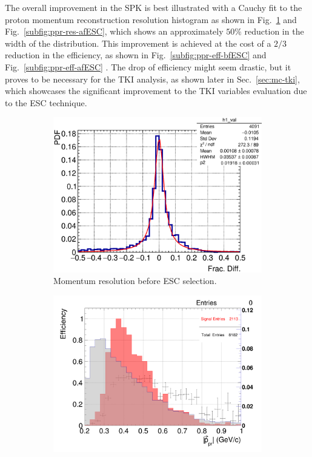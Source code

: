    The overall improvement in the SPK is best illustrated with a Cauchy fit to the proton momentum reconstruction resolution histogram as shown in Fig.~\ref{subfig:ppr-res-bfESC} and Fig.~\ref{subfig:ppr-res-afESC}, which shows an approximately $50\%$ reduction in the width of the distribution.
   This improvement is achieved at the cost of a $2/3$ reduction in the efficiency, as shown in Fig.~\ref{subfig:ppr-eff-bfESC} and Fig.~\ref{subfig:ppr-eff-afESC} .
   The drop of efficiency might seem drastic, but it proves to be necessary for the TKI analysis, as shown later in Sec.~\ref{sec:mc-tki}, which showcases the significant improvement to the TKI variables evaluation due to the ESC technique. 

   \begin{figure}[t]
      \centering
      \begin{subfigure}{\dbfigwid\textwidth}
           \includegraphics[width=\textwidth]{figures/sel/p_pr_res_pdf_al13_zoom.eps}
           \caption{Momentum resolution before ESC selection.}
           \label{subfig:ppr-res-bfESC}
      \end{subfigure}
      \begin{subfigure}{\dbfigwid\textwidth}
           \includegraphics[width=\textwidth]{figures/sel/p_pr_eff_al13.png}

\end{subfigure}
\end{figure}
